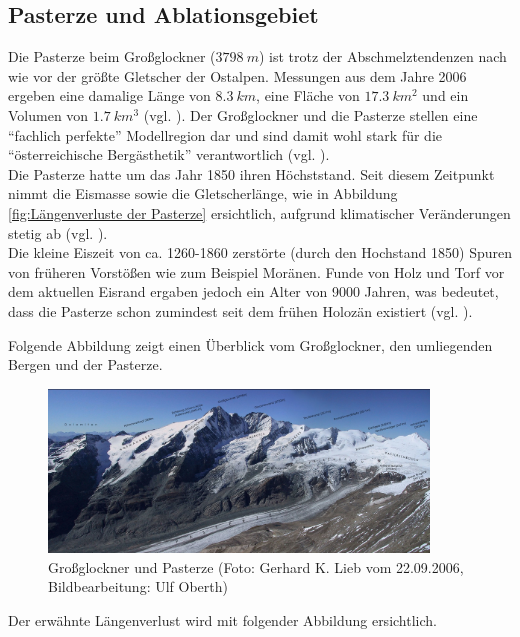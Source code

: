 \documentclass[11pt,a4paper]{article}
\begin{document}
\subsection{Pasterze und Ablationsgebiet}
Die Pasterze beim Großglockner ($3798~m$) ist trotz der Abschmelztendenzen nach wie vor der größte Gletscher der Ostalpen. Messungen aus dem Jahre 2006 ergeben eine damalige Länge von $8.3~km$, eine Fläche von $17.3~km^2$ und ein Volumen von $1.7~km^3$ (vgl. \cite[10]{Pasterze}). Der Großglockner und die Pasterze stellen eine ``fachlich perfekte'' Modellregion dar und sind damit wohl stark für die ``österreichische Bergästhetik'' verantwortlich (vgl. \cite[13]{Pasterze}).\\
Die Pasterze hatte um das Jahr 1850 ihren Höchststand. Seit diesem Zeitpunkt nimmt die Eismasse sowie die Gletscherlänge, wie in Abbildung \ref{fig:Längenverluste der Pasterze} ersichtlich, aufgrund klimatischer Veränderungen stetig ab (vgl. \cite[17]{Pasterze}).\\

Die kleine Eiszeit von ca. 1260-1860 zerstörte (durch den Hochstand 1850) Spuren von früheren Vorstößen wie zum Beispiel Moränen. Funde von Holz und Torf vor dem aktuellen Eisrand ergaben jedoch ein Alter von 9000 Jahren, was bedeutet, dass die Pasterze schon zumindest seit dem frühen Holozän existiert (vgl. \cite[24]{Pasterze}).

Folgende Abbildung zeigt einen Überblick vom Großglockner, den umliegenden Bergen und der Pasterze. 
\begin{figure}[H]
\centering
\includegraphics[width=0.9\textwidth]{pictures/Pasterze_Beschriftung_bw.jpg}
\caption[Großglockner und Pasterze]{Großglockner und Pasterze (Foto: Gerhard K. Lieb vom 22.09.2006, Bildbearbeitung: Ulf Oberth)}
\label{fig:Grossglockner und Pasterze}
\end{figure}


Der erwähnte Längenverlust wird mit folgender Abbildung ersichtlich.
\end{document}

